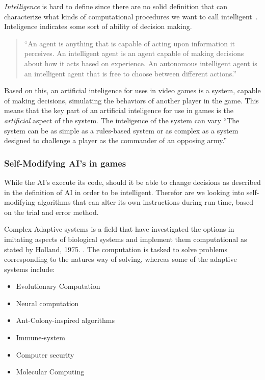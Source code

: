 \emph{Intelligence} is hard to define since there are no solid definition that can characterize what kinds of computational procedures we want to call intelligent~\cite{McCarthy2007}. Inteligence indicates some sort of ability of decision making.

\blockquote[{\autocite{Mills2005}}]{\enquote{An agent is anything that is capable of acting upon information it perceives. An intelligent agent is an agent capable of making decisions about how it acts based on experience. An autonomous intelligent agent is an intelligent agent that is free to choose between different actions.}}

Based on this, an artificial inteligence for uses in video games is a system, capable of making decisions, simulating the behaviors of another player in the game.
This means that the key part of an artificial inteligence for use in games is the \emph{artificial} aspect of the system. The inteligence of the system can vary \enquote{The system can be as simple as a rules-based system or as complex as a system designed to challenge a player as the commander of an opposing army.}\autocite{Kehoe2009}


\subsubsection{Self-Modifying AI's in games}

While the AI's execute its code, should it be able to change decisions as described in the definition of AI in order to be intelligent. Therefor are we looking into self-modifying algorithms that can alter its own instructions during run time, based on the trial and error method.

Complex Adaptive systems is a field that have investigated the options in imitating aspects of biological systems and implement them computational as stated by Holland, 1975. \cite {Holland1975}. The computation is tasked to solve problems corresponding to the natures way of solving, whereas some of the adaptive systems include:

	\begin{itemize}
	\item Evolutionary Computation
	\item Neural computation
	\item Ant-Colony-inspired algorithms
	\item Immune-system
	\item Computer security
	\item Molecular Computing
	 \end{itemize}


